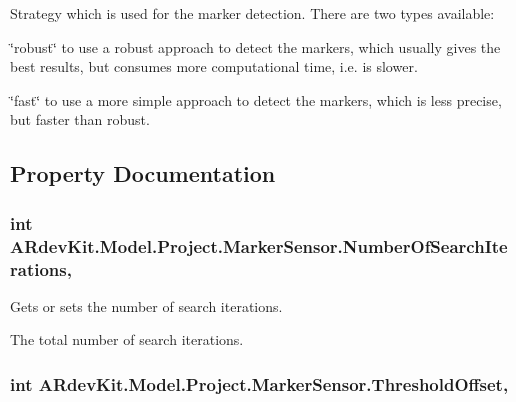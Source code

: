 Strategy which is used for the marker detection. There are two types available\-: 


\begin{DoxyItemize}
\item \char`\"{}robust\char`\"{} to use a robust approach to detect the markers, which usually gives the best results, but consumes more computational time, i.\-e. is slower.
\item \char`\"{}fast\char`\"{} to use a more simple approach to detect the markers, which is less precise, but faster than robust. 
\end{DoxyItemize}

\subsection{Property Documentation}
\hypertarget{class_a_rdev_kit_1_1_model_1_1_project_1_1_marker_sensor_a106f06e0fb75947b4748a392e7a520b7}{
\subsubsection[{Number\-Of\-Search\-Iterations}]{\setlength{\rightskip}{0pt plus 5cm}int A\-Rdev\-Kit.\-Model.\-Project.\-Marker\-Sensor.\-Number\-Of\-Search\-Iterations\hspace{0.3cm}{\ttfamily [get]}, {\ttfamily [set]}}}\label{class_a_rdev_kit_1_1_model_1_1_project_1_1_marker_sensor_a106f06e0fb75947b4748a392e7a520b7}


Gets or sets the number of search iterations. 

The total number of search iterations. \hypertarget{class_a_rdev_kit_1_1_model_1_1_project_1_1_marker_sensor_a704b4bc065e8b27d457c2cfbedee7a79}{
\subsubsection[{Threshold\-Offset}]{\setlength{\rightskip}{0pt plus 5cm}int A\-Rdev\-Kit.\-Model.\-Project.\-Marker\-Sensor.\-Threshold\-Offset\hspace{0.3cm}{\ttfamily [get]}, {\ttfamily [set]}}}\label{class_a_rdev_kit_1_1_model_1_1_project_1_1_marker_sensor_a704b4bc065e8b27d457c2cfbedee7a79}


